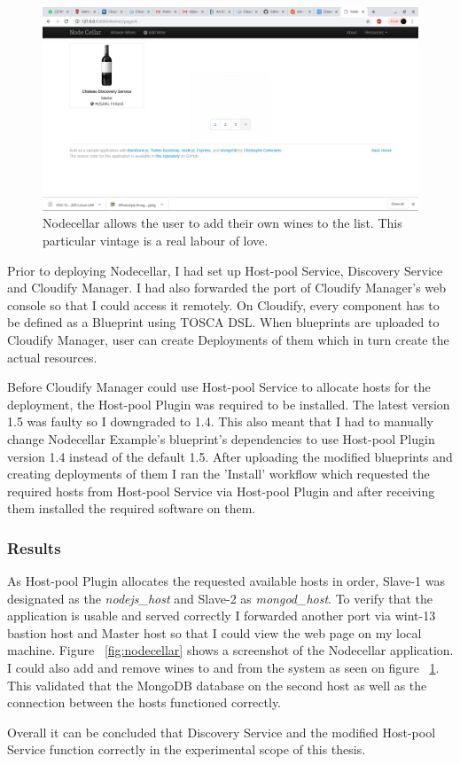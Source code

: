  \begin{figure}[ht!]
\centering
  \includegraphics[width=\textwidth, keepaspectratio]{chateaudiscoveryservice.png}%
  \caption{Nodecellar allows the user to add their own wines to the list. This particular vintage is a real labour of love.}
  \label{fig:chateau}
\end{figure}

Prior to deploying Nodecellar, I had set up Host-pool Service, Discovery Service and Cloudify Manager. I had also forwarded the port of Cloudify Manager's web console so that I could access it remotely. On Cloudify, every component has to be defined as a Blueprint using TOSCA DSL. When blueprints are uploaded to Cloudify Manager, user can create Deployments of them which in turn create the actual resources.

Before Cloudify Manager could use Host-pool Service to allocate hosts for the deployment, the Host-pool Plugin was required to be installed. The latest version 1.5 was faulty so I downgraded to 1.4. This also meant that I had to manually change Nodecellar Example's blueprint's dependencies to use Host-pool Plugin version 1.4 instead of the default 1.5. After uploading the modified blueprints and creating deployments of them I ran the 'Install' workflow which requested the required hosts from Host-pool Service via Host-pool Plugin and after receiving them installed the required software on them.

\subsubsection*{Results}

As Host-pool Plugin allocates the requested available hosts in order, Slave-1 was designated as the \textit{nodejs\_host} and Slave-2 as \textit{mongod\_host}. To verify that the application is usable and served correctly I forwarded another port via wint-13 bastion host and Master host so that I could  view the web page on my local machine. Figure ~\ref{fig:nodecellar} shows a screenshot of the Nodecellar application. I could also add and remove wines to and from the system as seen on figure ~\ref{fig:chateau}. This validated that the MongoDB database on the second host as well as the connection between the hosts functioned correctly.

Overall it can be concluded that Discovery Service and the modified Host-pool Service function correctly in the experimental scope of this thesis.


\newpage